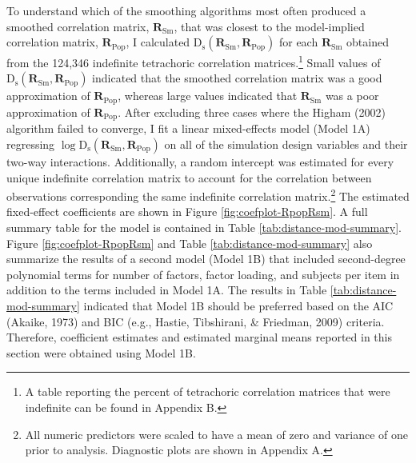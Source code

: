 \documentclass[
  english,
  man]{apa6}
\begin{document}
To understand which of the smoothing algorithms most often produced a smoothed correlation matrix, \(\mathbf{R}_{\textrm{Sm}}\), that was closest to the model-implied correlation matrix, \(\mathbf{R}_{\textrm{Pop}}\), I calculated \(\mathrm{D}_{\mathrm{s}}(\mathbf{R}_{\textrm{Sm}}, \mathbf{R}_{\textrm{Pop}})\) for each \(\mathbf{R}_{\textrm{Sm}}\) obtained from the 124,346 indefinite tetrachoric correlation matrices.\footnote{A table reporting the percent of tetrachoric correlation matrices that were indefinite can be found in Appendix B.} Small values of \(\mathrm{D}_{\mathrm{s}}(\mathbf{R}_{\textrm{Sm}}, \mathbf{R}_{\textrm{Pop}})\) indicated that the smoothed correlation matrix was a good approximation of \(\mathbf{R}_{\textrm{Pop}}\), whereas large values indicated that \(\mathbf{R}_{\textrm{Sm}}\) was a poor approximation of \(\mathbf{R}_{\textrm{Pop}}\). After excluding three cases where the Higham (2002) algorithm failed to converge, I fit a linear mixed-effects model (Model 1A) regressing \(\log \mathrm{D}_{\mathrm{s}}(\mathbf{R}_{\textrm{Sm}}, \mathbf{R}_{\textrm{Pop}})\) on all of the simulation design variables and their two-way interactions. Additionally, a random intercept was estimated for every unique indefinite correlation matrix to account for the correlation between observations corresponding the same indefinite correlation matrix.\footnote{All numeric predictors were scaled to have a mean of zero and variance of one prior to analysis. Diagnostic plots are shown in Appendix A.} The estimated fixed-effect coefficients are shown in Figure \ref{fig:coefplot-RpopRsm}. A full summary table for the model is contained in Table \ref{tab:distance-mod-summary}. Figure \ref{fig:coefplot-RpopRsm} and Table \ref{tab:distance-mod-summary} also summarize the results of a second model (Model 1B) that included second-degree polynomial terms for number of factors, factor loading, and subjects per item in addition to the terms included in Model 1A. The results in Table \ref{tab:distance-mod-summary} indicated that Model 1B should be preferred based on the AIC (Akaike, 1973) and BIC (e.g., Hastie, Tibshirani, \& Friedman, 2009) criteria. Therefore, coefficient estimates and estimated marginal means reported in this section were obtained using Model 1B.
\end{document}
